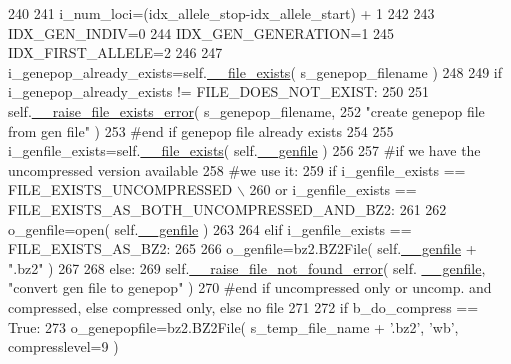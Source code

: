 \begin{DoxyCode}
240 
241         i\_num\_loci=(idx\_allele\_stop-idx\_allele\_start) + 1
242 
243         IDX\_GEN\_INDIV=0
244         IDX\_GEN\_GENERATION=1
245         IDX\_FIRST\_ALLELE=2
246 
247         i\_genepop\_already\_exists=self.\hyperlink{classnegui_1_1pgoutputsimupop_1_1PGOutputSimuPop_a1fdfb988619bd4a9d377a1e20f52839c}{\_\_file\_exists}( s\_genepop\_filename )
248 
249         \textcolor{keywordflow}{if} i\_genepop\_already\_exists != FILE\_DOES\_NOT\_EXIST:
250 
251             self.\hyperlink{classnegui_1_1pgoutputsimupop_1_1PGOutputSimuPop_ad3f4c271b5b800d0137460e2349452e0}{\_\_raise\_file\_exists\_error}( s\_genepop\_filename, 
252                     \textcolor{stringliteral}{"create genepop file from gen file"} )
253         \textcolor{comment}{#end if genepop file already exists}
254 
255         i\_genfile\_exists=self.\hyperlink{classnegui_1_1pgoutputsimupop_1_1PGOutputSimuPop_a1fdfb988619bd4a9d377a1e20f52839c}{\_\_file\_exists}( self.\hyperlink{classnegui_1_1pgoutputsimupop_1_1PGOutputSimuPop_a30fb6b94af13efad6becfbe6fddc1d95}{\_\_genfile} )
256         
257         \textcolor{comment}{#if we have the uncompressed version available}
258         \textcolor{comment}{#we use it:}
259         \textcolor{keywordflow}{if} i\_genfile\_exists == FILE\_EXISTS\_UNCOMPRESSED \(\backslash\)
260             \textcolor{keywordflow}{or} i\_genfile\_exists == FILE\_EXISTS\_AS\_BOTH\_UNCOMPRESSED\_AND\_BZ2:
261 
262             o\_genfile=open( self.\hyperlink{classnegui_1_1pgoutputsimupop_1_1PGOutputSimuPop_a30fb6b94af13efad6becfbe6fddc1d95}{\_\_genfile} )
263 
264         \textcolor{keywordflow}{elif} i\_genfile\_exists == FILE\_EXISTS\_AS\_BZ2:
265 
266             o\_genfile=bz2.BZ2File( self.\hyperlink{classnegui_1_1pgoutputsimupop_1_1PGOutputSimuPop_a30fb6b94af13efad6becfbe6fddc1d95}{\_\_genfile} + \textcolor{stringliteral}{".bz2"} )
267 
268         \textcolor{keywordflow}{else}:
269             self.\hyperlink{classnegui_1_1pgoutputsimupop_1_1PGOutputSimuPop_abf6aab4f7982c2b0f9e4544343bf241b}{\_\_raise\_file\_not\_found\_error}( self.
      \hyperlink{classnegui_1_1pgoutputsimupop_1_1PGOutputSimuPop_a30fb6b94af13efad6becfbe6fddc1d95}{\_\_genfile}, \textcolor{stringliteral}{"convert gen file to genepop"} )
270         \textcolor{comment}{#end if uncompressed only or uncomp. and compressed, else compressed only, else no file}
271         
272         \textcolor{keywordflow}{if} b\_do\_compress == \textcolor{keyword}{True}:
273             o\_genepopfile=bz2.BZ2File( s\_temp\_file\_name + \textcolor{stringliteral}{'.bz2'}, \textcolor{stringliteral}{'wb'}, compresslevel=9 ) 

\end{DoxyCode}
